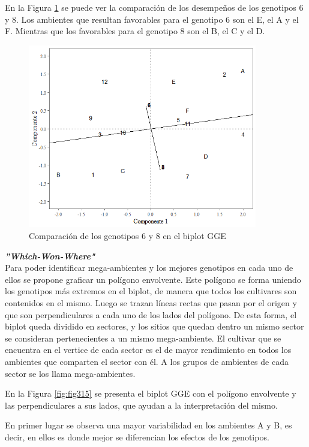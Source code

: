 En la Figura  \ref{fig:fig314} se puede ver la comparación de los desempeños de los genotipos 6 y 8. Los ambientes que resultan favorables para el genotipo 6 son el E, el A y el F. Mientras que los favorables para el genotipo 8 son el B, el C y el D.

\begin{figure}[H]
	\begin{center}
		\includegraphics[width=10cm]{./Graficos/comp_gen_GGE.png}
	\end{center}
	\caption{Comparación de los genotipos 6 y 8 en el biplot GGE}
	\label{fig:fig314}
\end{figure}


\textbf{\emph{''Which-Won-Where"}}\\

Para poder identificar mega-ambientes y los mejores genotipos en cada uno de ellos se propone graficar un polígono envolvente. Este polígono se forma uniendo los genotipos más extremos en el biplot, de manera que todos los cultivares son contenidos en el mismo. Luego se trazan líneas rectas que pasan por el origen y que son perpendiculares a cada uno de los lados del polígono. De esta forma, el biplot queda dividido en sectores, y los sitios que quedan dentro un mismo sector se consideran pertenecientes a un mismo mega-ambiente. El cultivar que se encuentra en el vertice de cada sector es el de mayor rendimiento en todos los ambientes que comparten el sector con él. A los grupos de ambientes de cada sector se los llama mega-ambientes.

En la Figura \ref{fig:fig315} se presenta el biplot GGE con el polígono envolvente y las perpendiculares a sus lados, que ayudan a la interpretación del mismo.


En primer lugar se observa una mayor variabilidad en los ambientes A y B, es decir, en ellos es donde mejor se diferencian los efectos de los genotipos.


